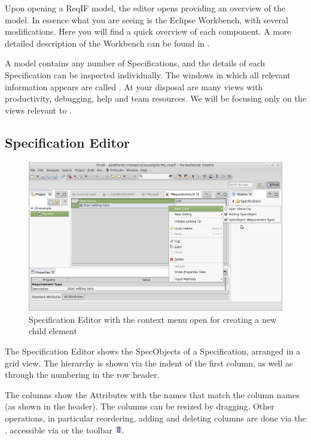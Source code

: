 Upon opening a ReqIF model, the editor opens providing an overview of the model.  In essence what you are seeing is the Eclipse Workbench, with several modifications.  Here you will find a quick overview of each component.  A more detailed description of the Workbench can be found in 
.

A model contains any number of Specifications, and the details of each Specification can be inspected individually.  The windows in which all relevant information appears are called .  At your disposal are many views with productivity, debugging, help and team resources.  We will be focusing only on the views relevant to \pror{}.

\subsection{Specification Editor}

\begin{figure}
  \centering
  \includegraphics[width=\linewidth]{../rmf-images/default_spec_view.png}
  \caption{Specification Editor with the context menu open for creating a new child element}
  \label{fig:default specification editor}
\end{figure}

The Specification Editor shows the SpecObjects of a Specification, arranged in a grid view.  The hierarchy is shown via the indent of the first column, as well as through the numbering in the row header.

The columns show the Attributes with the names that match the column names (as shown in the header).  The columns can be resized by dragging.  Other operations, in particular reordering, adding and deleting columns are done via the , accessible via  or the toolbar \includegraphics[height=0.8em]{../rmf-images/icons/full/obj16/Column.png}. 

